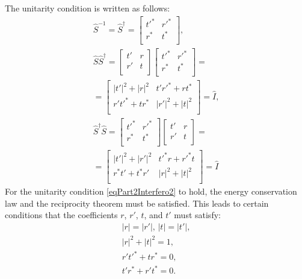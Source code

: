 The unitarity condition is written as follows:
\begin{eqnarray}
\hat{S}^{-1} = 
\hat{S}^{\dag} =
\begin{bmatrix}
t'^\ast & r'^\ast \\
r^\ast & t^\ast \\
\end{bmatrix}, 
\nonumber \\
\hat{S} \hat{S}^{\dag} =
\begin{bmatrix}
t' & r \\
r' & t \\
\end{bmatrix}
\begin{bmatrix}
t'^\ast & r'^\ast \\
r^\ast & t^\ast \\
\end{bmatrix} =
\nonumber \\
=
\begin{bmatrix}
\left|t'\right|^2 + \left|r\right|^2 & t' r'^\ast + r t^\ast \\
r' t'^\ast + t r^\ast & \left|r'\right|^2 + \left|t\right|^2 \\
\end{bmatrix} = 
\hat{I},
\nonumber \\
\hat{S}^{\dag} \hat{S} =
\begin{bmatrix}
t'^\ast & r'^\ast \\
r^\ast & t^\ast \\
\end{bmatrix}
\begin{bmatrix}
t' & r \\
r' & t \\
\end{bmatrix}
 =
\nonumber \\
=
\begin{bmatrix}
\left|t'\right|^2 + \left|r'\right|^2 & t'^\ast r + r'^\ast t \\
r^\ast t' + t^\ast r' & \left|r\right|^2 + \left|t\right|^2 \\
\end{bmatrix} = 
\hat{I}
\label{eqPart2Interfero2}
\end{eqnarray}
For the unitarity condition
\eqref{eqPart2Interfero2} to hold, the energy conservation law and the reciprocity theorem must be satisfied. This leads to certain conditions that the coefficients $r$, $r'$, $t$, and $t'$ must satisfy:
\begin{eqnarray}
\left|r\right| = \left|r'\right|, \, \left|t\right| = \left|t'\right|,
\nonumber \\
\left|r\right|^2 + \left|t\right|^2 = 1, 
\nonumber \\
r' t'^\ast + t r^\ast = 0,
\nonumber \\
t' r^\ast + r' t^\ast = 0.
\label{eqPart2Interfero3}
\end{eqnarray}
